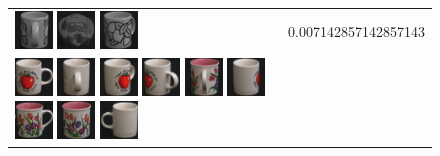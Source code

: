 \begin{figure}[!bp]
\begin{tabular}{m{11cm} | m{3cm} |}
\includegraphics[width=1cm]{coil/beeld-53.eps}
\includegraphics[width=1cm]{coil/beeld-29.eps}
\includegraphics[width=1cm]{coil/beeld-51.eps}
& {\scriptsize 0.007142857142857143}
\\
\includegraphics[width=1cm]{coil/beeld-36.eps}
\includegraphics[width=1cm]{coil/beeld-41.eps}
\includegraphics[width=1cm]{coil/beeld-39.eps}
\includegraphics[width=1cm]{coil/beeld-40.eps}
\includegraphics[width=1cm]{coil/beeld-11.eps}
\includegraphics[width=1cm]{coil/beeld-38.eps}
\includegraphics[width=1cm]{coil/beeld-6.eps}
\includegraphics[width=1cm]{coil/beeld-8.eps}
\includegraphics[width=1cm]{coil/beeld-37.eps}

\end{tabular}
\end{figure}
